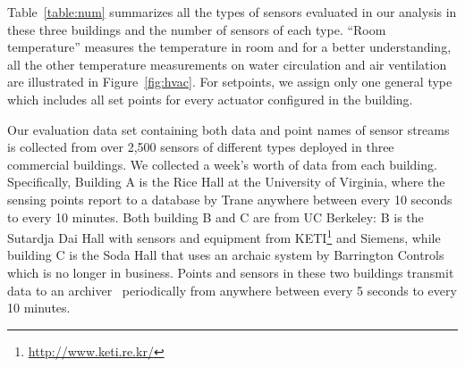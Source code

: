 Table~\ref{table:num} summarizes all the types of sensors evaluated in our analysis in these three buildings and the number of sensors of each type. ``Room temperature'' measures the temperature in room and for a better understanding, all the other temperature measurements on water circulation and air ventilation are illustrated in Figure~\ref{fig:hvac}. For setpoints, we assign only
one general type which includes all set points for every actuator configured in the building.

Our evaluation data set containing both data and point names of sensor streams is collected from over 2,500 sensors of different types deployed in three commercial buildings. 
We collected a week's worth of data from each building.
Specifically, Building A is the Rice Hall at the University of Virginia, where the sensing points report to a database by Trane anywhere between every 10 seconds to every 10 minutes.
Both building B and C are from UC Berkeley: B is the Sutardja Dai Hall with sensors and equipment from KETI\footnote{\url{http://www.keti.re.kr/}} and Siemens, while building C is the Soda Hall that uses an archaic system by Barrington Controls which is no longer in business. 
Points and sensors in these two buildings transmit data to an archiver~\cite{smap} periodically from anywhere between every 5 seconds to every 10 minutes.


